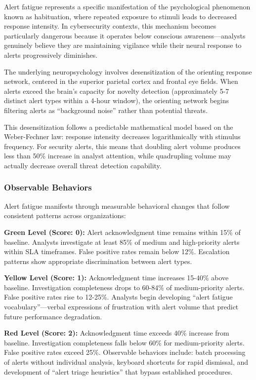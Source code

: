 \documentclass[11pt,a4paper]{article}
\begin{document}
Alert fatigue represents a specific manifestation of the psychological phenomenon known as habituation, where repeated exposure to stimuli leads to decreased response intensity\cite{rankin2009}. In cybersecurity contexts, this mechanism becomes particularly dangerous because it operates below conscious awareness---analysts genuinely believe they are maintaining vigilance while their neural response to alerts progressively diminishes.

The underlying neuropsychology involves desensitization of the orienting response network, centered in the superior parietal cortex and frontal eye fields\cite{corbetta2002}. When alerts exceed the brain's capacity for novelty detection (approximately 5-7 distinct alert types within a 4-hour window), the orienting network begins filtering alerts as ``background noise'' rather than potential threats.

This desensitization follows a predictable mathematical model based on the Weber-Fechner law: response intensity decreases logarithmically with stimulus frequency. For security alerts, this means that doubling alert volume produces less than 50\% increase in analyst attention, while quadrupling volume may actually decrease overall threat detection capability.

\subsubsection{Observable Behaviors}

Alert fatigue manifests through measurable behavioral changes that follow consistent patterns across organizations:

\textbf{Green Level (Score: 0):} Alert acknowledgment time remains within 15\% of baseline. Analysts investigate at least 85\% of medium and high-priority alerts within SLA timeframes. False positive rates remain below 12\%. Escalation patterns show appropriate discrimination between alert types.

\textbf{Yellow Level (Score: 1):} Acknowledgment time increases 15-40\% above baseline. Investigation completeness drops to 60-84\% of medium-priority alerts. False positive rates rise to 12-25\%. Analysts begin developing ``alert fatigue vocabulary''---verbal expressions of frustration with alert volume that predict future performance degradation.

\textbf{Red Level (Score: 2):} Acknowledgment time exceeds 40\% increase from baseline. Investigation completeness falls below 60\% for medium-priority alerts. False positive rates exceed 25\%. Observable behaviors include: batch processing of alerts without individual analysis, keyboard shortcuts for rapid dismissal, and development of ``alert triage heuristics'' that bypass established procedures.
\end{document}
